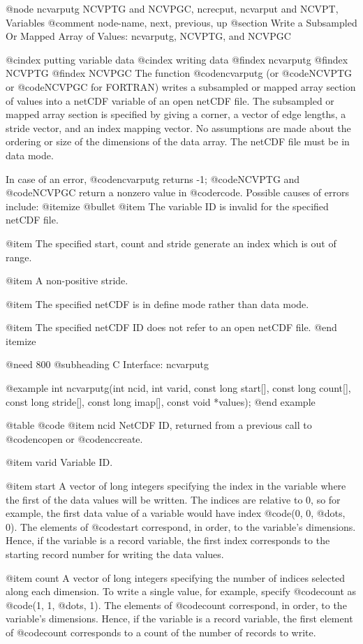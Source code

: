 @node ncvarputg NCVPTG and NCVPGC, ncrecput, ncvarput and NCVPT, Variables
@comment  node-name,  next,  previous,  up
@section Write a Subsampled Or Mapped Array of Values:  ncvarputg, NCVPTG, and NCVPGC

@cindex putting variable data
@cindex writing data
@findex ncvarputg
@findex NCVPTG
@findex NCVPGC
The function @code{ncvarputg} (or @code{NCVPTG} or @code{NCVPGC} for
FORTRAN) writes a subsampled or mapped array section of values into a
netCDF variable of an open netCDF file.  The subsampled or mapped array
section is specified by giving a corner, a vector of edge lengths, a
stride vector, and an index mapping vector.  No assumptions are made
about the ordering or size of the dimensions of the data array.  The
netCDF file must be in data mode.

In case of an error, @code{ncvarputg} returns -1; @code{NCVPTG} and
@code{NCVPGC} return a
nonzero value in @code{rcode}.  Possible causes of errors include:
@itemize @bullet
@item
The variable ID is invalid for the specified netCDF file.

@item
The specified start, count and stride generate an index which is out of range.

@item
A non-positive stride.

@item
The specified netCDF is in define mode rather than data mode.

@item
The specified netCDF ID does not refer to an open netCDF file.
@end itemize

@need 800
@subheading C Interface:  ncvarputg

@example
int ncvarputg(int ncid, int varid, const long start[], const long count[],
              const long stride[], const long imap[], const void *values);
@end example

@table @code
@item ncid
NetCDF ID, returned from a previous call to @code{ncopen} or @code{nccreate}.

@item varid
Variable ID.

@item start
A vector of long integers specifying the index in the variable where the
first of the data values will be written.  The indices are relative to
0, so for example, the first data value of a variable would have index
@code{(0, 0, @dots{}, 0)}.  The elements of @code{start} correspond, in
order, to the variable's dimensions.  Hence, if the variable is a record
variable, the first index corresponds to the starting record number
for writing the data values.

@item count
A vector of long integers specifying the number of indices selected along each
dimension.  To write a single
value, for example, specify @code{count} as @code{(1, 1, @dots{}, 1)}.
The elements of @code{count} correspond, in order, to the variable's
dimensions.  Hence, if the variable is a record variable, the first
element of @code{count} corresponds to a count of the number of records
to write.

